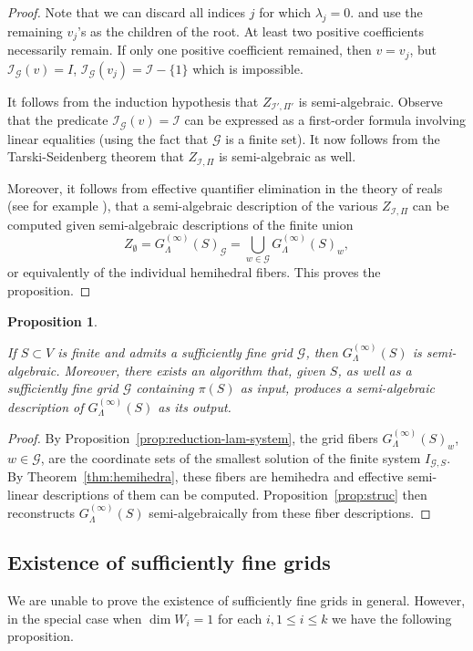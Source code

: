 \documentclass[10pt]{amsart}
\theoremstyle{plain}
\newtheorem{proposition}[lemma]{Proposition}
\theoremstyle{definition}
\providecommand{\cG}[0]{\ensuremath{\mathcal G}\xspace}
\providecommand{\cI}[0]{\ensuremath{\mathcal I}\xspace}
\let\leq\leqslant
\begin{document}
\begin{proof}
Note that we can discard all indices $j$ for which $\lambda_j = 0$.
and use the remaining $v_j$'s 
as the children of the root.
At least two positive coefficients necessarily remain. If only one positive coefficient remained, then $v=v_j$, but $\cI_\cG(v) =I$, $\cI_\cG(v_j) = \cI - \{1\}$ which is impossible.

It follows from the induction hypothesis that 
$Z_{\cI',\Pi'}$ is semi-algebraic. 
Observe that the predicate $\cI_\cG(v) = \cI$ can be expressed as a first-order formula involving linear equalities (using the fact that $\cG$ is a finite set). 
It now follows from the Tarski-Seidenberg theorem \cite{BPRbook2} that $Z_{\cI,\Pi}$ is semi-algebraic as well.

Moreover, it follows from effective quantifier elimination in the theory of reals (see for example \cite[Chapter 14]{BPRbook2}),  
that a semi-algebraic description of the various $Z_{\cI,\Pi}$ can be computed 
given semi-algebraic descriptions of the finite union
\[
Z_\emptyset=G_\Lambda^{(\infty)}(S)_\cG
=
\bigcup_{w\in \cG}G_\Lambda^{(\infty)}(S)_w,
\]
or equivalently of the individual hemihedral fibers.
This proves the proposition.
\end{proof}

\begin{proposition}
\label{prop:laminar}
 
If \(S\subset V\) is finite and admits a sufficiently fine grid \(\cG\),
then
\(G_\Lambda^{(\infty)}(S)\) is semi-algebraic.
Moreover, there exists an algorithm that, given $S$, as well
as a sufficiently fine grid $\cG$ containing $\pi(S)$ as input, 
produces a semi-algebraic description of $G_\Lambda^{(\infty)}(S)$ as its output.
\end{proposition}

\begin{proof}
By Proposition~\ref{prop:reduction-lam-system}, the grid fibers \(G_\Lambda^{(\infty)}(S)_w\), \(w\in \cG\),
are the coordinate sets of the smallest solution of the finite system \(I_{\cG, S}\).
By Theorem~\ref{thm:hemihedra}, these fibers are hemihedra and effective semi-linear
descriptions of them can be computed. Proposition~\ref{prop:struc} then reconstructs
\(G_\Lambda^{(\infty)}(S)\) semi-algebraically from these fiber descriptions.
\end{proof}

\subsection{Existence of sufficiently fine grids}
\label{subsec:existence-of-grid}
We are unable to prove the existence of sufficiently fine grids in general.
However, in the special case when $\dim W_i = 1$ for each $i, 1\leq i \leq k$
we have the following proposition.
\end{document}
